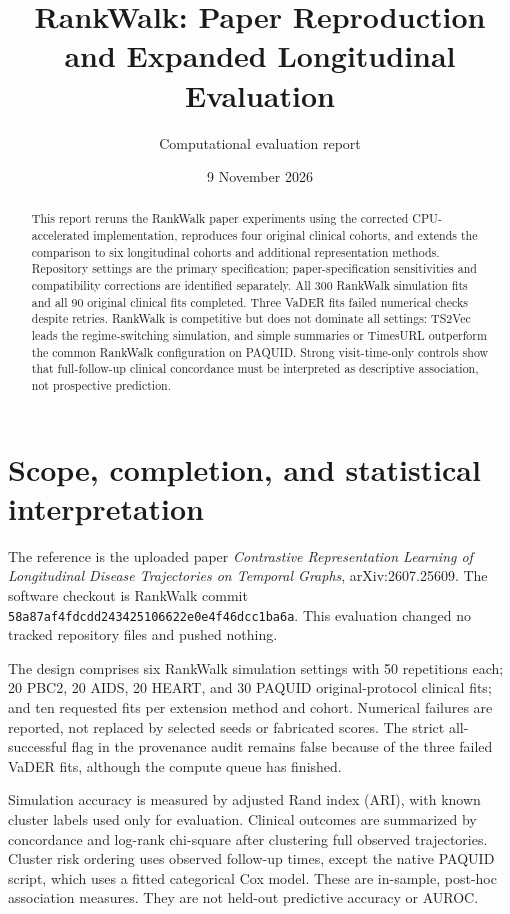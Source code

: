 \documentclass[11pt,a4paper]{article}
\title{RankWalk: Paper Reproduction and Expanded Longitudinal Evaluation}
\author{Computational evaluation report}
\date{9 November 2026}
\begin{document}
\maketitle
\begin{abstract}
This report reruns the RankWalk paper experiments using the corrected CPU-accelerated implementation, reproduces four original clinical cohorts, and extends the comparison to six longitudinal cohorts and additional representation methods. Repository settings are the primary specification; paper-specification sensitivities and compatibility corrections are identified separately. All 300 RankWalk simulation fits and all 90 original clinical fits completed. Three VaDER fits failed numerical checks despite retries. RankWalk is competitive but does not dominate all settings: TS2Vec leads the regime-switching simulation, and simple summaries or TimesURL outperform the common RankWalk configuration on PAQUID. Strong visit-time-only controls show that full-follow-up clinical concordance must be interpreted as descriptive association, not prospective prediction.
\end{abstract}
\tableofcontents
\clearpage
\section{Scope, completion, and statistical interpretation}
The reference is the uploaded paper \emph{Contrastive Representation Learning of Longitudinal Disease Trajectories on Temporal Graphs}, arXiv:2607.25609. The software checkout is RankWalk commit \texttt{58a87af4fdcdd243425106622e0e4f46dcc1ba6a}. This evaluation changed no tracked repository files and pushed nothing.

The design comprises six RankWalk simulation settings with 50 repetitions each; 20 PBC2, 20 AIDS, 20 HEART, and 30 PAQUID original-protocol clinical fits; and ten requested fits per extension method and cohort. Numerical failures are reported, not replaced by selected seeds or fabricated scores. The strict all-successful flag in the provenance audit remains false because of the three failed VaDER fits, although the compute queue has finished.

Simulation accuracy is measured by adjusted Rand index (ARI), with known cluster labels used only for evaluation. Clinical outcomes are summarized by concordance and log-rank chi-square after clustering full observed trajectories. Cluster risk ordering uses observed follow-up times, except the native PAQUID script, which uses a fitted categorical Cox model. These are in-sample, post-hoc association measures. They are not held-out predictive accuracy or AUROC.
\end{document}
